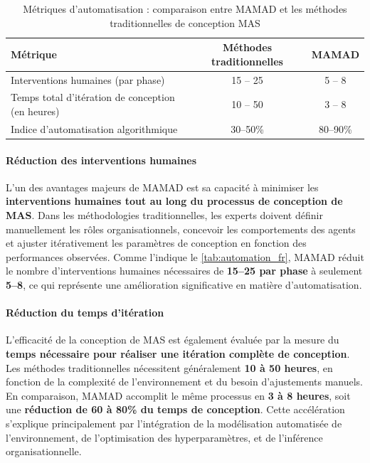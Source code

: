 \begin{table}[h!]
    \centering
    \caption{Métriques d'automatisation : comparaison entre MAMAD et les méthodes traditionnelles de conception MAS}
    \begin{tabular}{lcc}
        \hline
        \textbf{Métrique}                                   & \textbf{Méthodes traditionnelles} & \textbf{MAMAD} \\
        \hline
        Interventions humaines (par phase)                 & 15 -- 25                          & 5 -- 8         \\
        \hline
        Temps total d'itération de conception (en heures)  & 10 -- 50                          & 3 -- 8         \\
        \hline
        Indice d'automatisation algorithmique              & 30--50\%                          & 80--90\%       \\
        \hline
    \end{tabular}
    \label{tab:automation_fr}
\end{table}

\paragraph{Réduction des interventions humaines}

L'un des avantages majeurs de MAMAD est sa capacité à minimiser les \textbf{interventions humaines tout au long du processus de conception de MAS}. Dans les méthodologies traditionnelles, les experts doivent définir manuellement les rôles organisationnels, concevoir les comportements des agents et ajuster itérativement les paramètres de conception en fonction des performances observées. Comme l'indique le \autoref{tab:automation_fr}, MAMAD réduit le nombre d'interventions humaines nécessaires de \textbf{15--25 par phase} à seulement \textbf{5--8}, ce qui représente une amélioration significative en matière d'automatisation.

\paragraph{Réduction du temps d'itération}

L'efficacité de la conception de MAS est également évaluée par la mesure du \textbf{temps nécessaire pour réaliser une itération complète de conception}. Les méthodes traditionnelles nécessitent généralement \textbf{10 à 50 heures}, en fonction de la complexité de l'environnement et du besoin d'ajustements manuels. En comparaison, MAMAD accomplit le même processus en \textbf{3 à 8 heures}, soit une \textbf{réduction de 60 à 80\% du temps de conception}. Cette accélération s'explique principalement par l'intégration de la modélisation automatisée de l'environnement, de l'optimisation des hyperparamètres, et de l'inférence organisationnelle.

